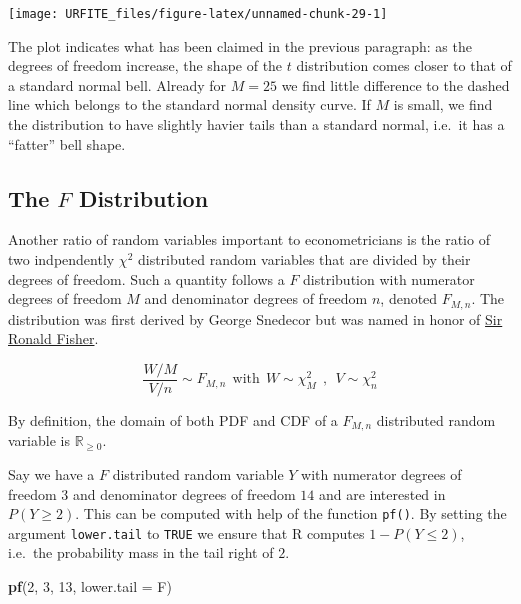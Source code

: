 \documentclass[]{book}
\newenvironment{Shaded}{\begin{snugshade}}{\end{snugshade}}
\newcommand{\KeywordTok}[1]{\textcolor[rgb]{0.13,0.29,0.53}{\textbf{#1}}}
\newcommand{\DataTypeTok}[1]{\textcolor[rgb]{0.13,0.29,0.53}{#1}}
\newcommand{\DecValTok}[1]{\textcolor[rgb]{0.00,0.00,0.81}{#1}}
\newcommand{\NormalTok}[1]{#1}
\theoremstyle{definition}
\theoremstyle{definition}
\theoremstyle{definition}
\theoremstyle{remark}
\begin{document}
\begin{center}\texttt{[image: URFITE\_files/figure-latex/unnamed-chunk-29-1]} \end{center}

The plot indicates what has been claimed in the previous paragraph: as
the degrees of freedom increase, the shape of the \(t\) distribution
comes closer to that of a standard normal bell. Already for \(M=25\) we
find little difference to the dashed line which belongs to the standard
normal density curve. If \(M\) is small, we find the distribution to
have slightly havier tails than a standard normal, i.e.~it has a
``fatter'' bell shape.

\subsection*{\texorpdfstring{The \(F\)
Distribution}{The F Distribution}}\label{the-f-distribution}

Another ratio of random variables important to econometricians is the
ratio of two indpendently \(\chi^2\) distributed random variables that
are divided by their degrees of freedom. Such a quantity follows a \(F\)
distribution with numerator degrees of freedom \(M\) and denominator
degrees of freedom \(n\), denoted \(F_{M,n}\). The distribution was
first derived by George Snedecor but was named in honor of
\href{https://en.wikipedia.org/wiki/Ronald_Fisher}{Sir Ronald Fisher}.

\[ \frac{W/M}{V/n} \sim F_{M,n} \ \ \text{with} \ \ W \sim \chi^2_M \ \ , \ \ V \sim \chi^2_n \]

By definition, the domain of both PDF and CDF of a \(F_{M,n}\)
distributed random variable is \(\mathbb{R}_{\geq0}\).

Say we have a \(F\) distributed random variable \(Y\) with numerator
degrees of freedom \(3\) and denominator degrees of freedom \(14\) and
are interested in \(P(Y \geq 2)\). This can be computed with help of the
function \texttt{pf()}. By setting the argument \texttt{lower.tail} to
\texttt{TRUE} we ensure that R computes \(1- P(Y \leq 2)\), i.e.~the
probability mass in the tail right of \(2\).

\begin{Shaded}
\begin{Highlighting}[]
\KeywordTok{pf}\NormalTok{(}\DecValTok{2}\NormalTok{, }\DecValTok{3}\NormalTok{, }\DecValTok{13}\NormalTok{, }\DataTypeTok{lower.tail =}\NormalTok{ F)}
\end{Highlighting}
\end{Shaded}
\end{document}

